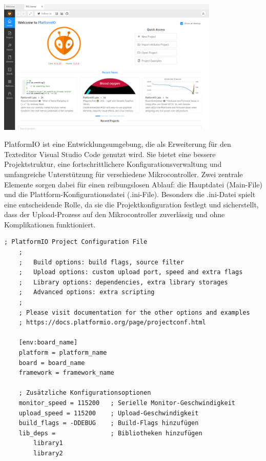 \documentclass[
    headings=optiontotocandhead,%
    twoside,
    numbers=noenddot,%
    12pt, %
    titlepage, %
    parskip=full, %
    listof=leveldown, 
    numbers=noenddot, %
    a4paper,DIV=14,
    BCOR=15mm,
]{scrbook}
\let\origfigure=\figure
\let\endorigfigure=\endfigure
\renewenvironment{figure}[1][]{%
   \origfigure[H]
}{%
   \endorigfigure
}
\begin{document}
\begin{figure}
\centering
\includegraphics[width=4.16667in,height=\textheight]{img/Kampl/PlatformIO.png}
\caption{PlatformIO}
\end{figure}

PlatformIO ist eine Entwicklungsumgebung, die als Erweiterung für den
Texteditor Visual Studio Code genutzt wird. Sie bietet eine bessere
Projektstruktur, eine fortschrittlichere Konfigurationsverwaltung und
umfangreiche Unterstützung für verschiedene Mikrocontroller. Zwei
zentrale Elemente sorgen dabei für einen reibungslosen Ablauf: die
Hauptdatei (Main-File) und die Plattform-Konfigurationsdatei
(.ini-File). Besonders die .ini-Datei spielt eine entscheidende Rolle,
da sie die Projektkonfiguration festlegt und sicherstellt, dass der
Upload-Prozess auf den Mikrocontroller zuverlässig und ohne
Komplikationen funktioniert.

\begin{lstlisting}[caption={Beispiel einer .ini Datei}]
    ; PlatformIO Project Configuration File
    ;
    ;   Build options: build flags, source filter
    ;   Upload options: custom upload port, speed and extra flags
    ;   Library options: dependencies, extra library storages
    ;   Advanced options: extra scripting
    ;
    ; Please visit documentation for the other options and examples
    ; https://docs.platformio.org/page/projectconf.html

    [env:board_name]
    platform = platform_name
    board = board_name
    framework = framework_name

    ; Zusätzliche Konfigurationsoptionen
    monitor_speed = 115200   ; Serielle Monitor-Geschwindigkeit
    upload_speed = 115200    ; Upload-Geschwindigkeit
    build_flags = -DDEBUG    ; Build-Flags hinzufügen
    lib_deps =               ; Bibliotheken hinzufügen
        library1
        library2
\end{lstlisting}
\end{document}
